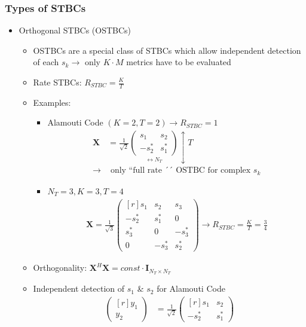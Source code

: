 \documentclass[a4paper, 10pt]{article}
\begin{document}
\subsubsection*{Types of STBCs}
\begin{itemize}
	\item Orthogonal STBCs (OSTBCs)
	\begin{itemize}
		\item OSTBCs are a special class of STBCs which allow independent detection of each $s_k \rightarrow$ only $K\cdot M$ metrics have to be evaluated
		\item Rate STBCs: $R_{STBC} = \frac{K}{T}$
		\item Examples:
		\begin{itemize}
			\item Alamouti Code  $(K = 2, T = 2) \rightarrow R_{STBC} = 1$
			\begin{align*}
				\textbf{X} &= \frac{1}{\sqrt{2}}\underset{\longleftrightarrow N_T}{\begin{pmatrix} s_1 & s_2 \\ -s_2^* & s_1^*	\end{pmatrix}}\updownarrow T\\
				\rightarrow &\text{ only ``full rate ´´ OSTBC for complex } s_k
			\end{align*}
			\item $N_T = 3, K = 3, T = 4$
			\begin{align*}
				\textbf{X} = \frac{1}{\sqrt{3}}\begin{pmatrix*}[r]	s_1 & s_2 & s_3 \\ -s_2^*  & s_1^* & 0 \\ s_3^* & 0 & -s_3^*\\0 & -s_3^* & s_2^*\end{pmatrix*} \rightarrow R_{STBC} = \frac{K}{T} = \frac{3}{4}
			\end{align*}
		\end{itemize}
		\item Orthogonality: $\textbf{X}^H\textbf{X} = {const}\cdot \textbf{I}_{N_T\times N_T}$
		\item Independent detection of $s_1$ \& $s_2$ for Alamouti Code
		\begin{align*}
				\begin{pmatrix*}[r]y_1 \\y_2 
			\end{pmatrix*} &= \frac{1}{\sqrt{2}}
			\begin{pmatrix*}[r]	s_1 & s_2 \\-s_2^* & s_1^*

\end{pmatrix*}
\end{align*}
\end{itemize}
\end{itemize}
\end{document}
